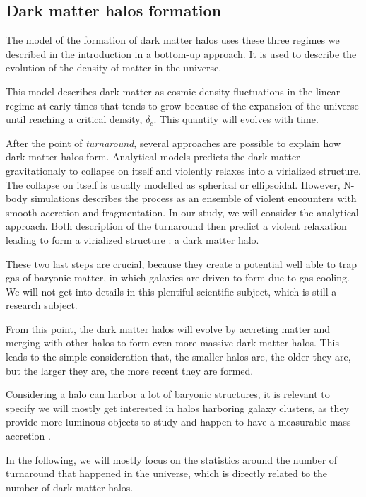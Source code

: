 \subsection{Dark matter halos formation}

The model of the formation of dark matter halos uses these three regimes we described in the introduction in a bottom-up approach. It is used to describe the evolution of the density of matter in the universe.

This model describes dark matter as cosmic density fluctuations in the linear regime at early times that tends to grow because of the expansion of the universe until reaching a critical density, $\delta_c$. This quantity will evolves with time. 

After the point of \textit{turnaround}, several approaches are possible\cite{Maggiore} to explain how dark matter halos form.
Analytical models predicts the dark matter gravitationaly to collapse on itself and violently relaxes into a virialized structure. The collapse on itself is usually modelled as spherical or ellipsoidal.
However, N-body simulations describes the process as an ensemble of violent encounters with smooth accretion and fragmentation. In our study, we will consider the analytical approach. 
Both description of the turnaround then predict a violent relaxation leading to form a virialized structure : a dark matter halo.

These two last steps are crucial, because they create a potential well able to trap gas of baryonic matter, in which galaxies are driven to form due to gas cooling. We will not get into details in this plentiful scientific subject, which is still a research subject.

From this point, the dark matter halos will evolve by accreting matter and merging with other halos to form even more massive dark matter halos. This leads to the simple consideration that, the smaller halos are, the older they are, but the larger they are, the more recent they are formed.


Considering a halo can harbor a lot of baryonic structures, it is relevant to specify we will mostly get interested in halos harboring galaxy clusters, as they provide more luminous objects to study and happen to have a measurable mass accretion \cite{DeBoni}.

In the following, we will mostly focus on the statistics around the number of turnaround that happened in the universe, which is directly related to the number of dark matter halos.

